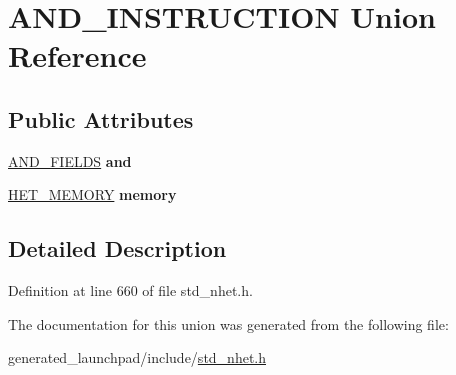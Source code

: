 \hypertarget{unionAND__INSTRUCTION}{}\section{A\+N\+D\+\_\+\+I\+N\+S\+T\+R\+U\+C\+T\+I\+ON Union Reference}
\label{unionAND__INSTRUCTION}
\subsection*{Public Attributes}
\begin{DoxyCompactItemize}
\item 
\mbox{\label{unionAND__INSTRUCTION_ac7231081634676d83a83a8e06f183a26}} 
\mbox{\hyperlink{structAND__format}{A\+N\+D\+\_\+\+F\+I\+E\+L\+DS}} {\bfseries and}
\item 
\mbox{\label{unionAND__INSTRUCTION_a75ce7cc9ab1c46e16a99c2207a836f93}} 
\mbox{\hyperlink{structmemory__format}{H\+E\+T\+\_\+\+M\+E\+M\+O\+RY}} {\bfseries memory}
\end{DoxyCompactItemize}


\subsection{Detailed Description}


Definition at line 660 of file std\+\_\+nhet.\+h.



The documentation for this union was generated from the following file\+:\begin{DoxyCompactItemize}
\item 
generated\+\_\+launchpad/include/\mbox{\hyperlink{std__nhet_8h}{std\+\_\+nhet.\+h}}\end{DoxyCompactItemize}
